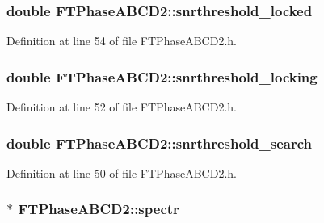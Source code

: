 \hypertarget{classFTPhaseABCD2_a362844ab768079d3668bffb950ca5d08}{
\subsubsection[{snrthreshold\_\-locked}]{\setlength{\rightskip}{0pt plus 5cm}double {\bf FTPhaseABCD2::snrthreshold\_\-locked}}}
\label{classFTPhaseABCD2_a362844ab768079d3668bffb950ca5d08}


Definition at line 54 of file FTPhaseABCD2.h.

\hypertarget{classFTPhaseABCD2_a15a2278557cd673190b99c846ac92d82}{
\subsubsection[{snrthreshold\_\-locking}]{\setlength{\rightskip}{0pt plus 5cm}double {\bf FTPhaseABCD2::snrthreshold\_\-locking}}}
\label{classFTPhaseABCD2_a15a2278557cd673190b99c846ac92d82}


Definition at line 52 of file FTPhaseABCD2.h.

\hypertarget{classFTPhaseABCD2_a2b6f4cf6d8ddaa87e3e49f840654acc7}{
\subsubsection[{snrthreshold\_\-search}]{\setlength{\rightskip}{0pt plus 5cm}double {\bf FTPhaseABCD2::snrthreshold\_\-search}}}
\label{classFTPhaseABCD2_a2b6f4cf6d8ddaa87e3e49f840654acc7}


Definition at line 50 of file FTPhaseABCD2.h.

\hypertarget{classFTPhaseABCD2_a67e7dfc25f4d00d204a71361c8a15195}{
\subsubsection[{spectr}]{$\ast$ {\bf FTPhaseABCD2::spectr}}}
\label{classFTPhaseABCD2_a67e7dfc25f4d00d204a71361c8a15195}


